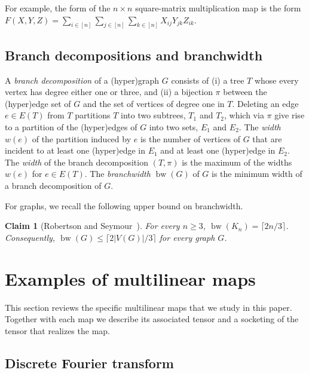 \documentclass[11pt]{article}
\numberwithin{equation}{section}
\newtheorem{claim}[theorem]{Claim}
\theoremstyle{definition}
\theoremstyle{plain}
\DeclareMathOperator{\bw}{bw}
\begin{document}
For example, the form of the $n \times n$ square-matrix multiplication
map is the form $F(X, Y, Z) = \sum_{i \in [n]} \sum_{j \in [n]}
\sum_{k \in [n]} X_{ij}Y_{jk}Z_{ik}$.

\subsection{Branch decompositions and branchwidth}

A \emph{branch decomposition} of a (hyper)graph $G$ consists of
(i) a tree $T$ whose every vertex has degree either one or three, and
(ii) a bijection $\pi$ between the (hyper)edge set of $G$ and the set of
vertices of degree one in $T$. Deleting an edge $e\in E(T)$ from $T$
partitions $T$ into two subtrees, %
 $T_1$ and $T_2$, which via $\pi$
%
give rise  %
to a partition of the (hyper)edges of $G$ into
two sets,  %
$E_1$ and $E_2$.
The \emph{width} $w(e)$
of the partition induced by $e$ is the number of vertices of $G$ that are
incident to at least one (hyper)edge in $E_1$ and at least one (hyper)edge
in $E_2$. The \emph{width} of the branch decomposition $(T,\pi)$ is the maximum
of the widths $w(e)$ for $e\in E(T)$. The \emph{branchwidth} $\bw(G)$ of $G$
is the minimum width of a branch decomposition of $G$.

For graphs, we recall the following upper bound on branchwidth.

\begin{claim}[Robertson and Seymour~\cite{RobertsonS1991}]
  For every $n \ge 3$, $\bw(K_n) = \lceil 2n/3 \rceil$.  Consequently, $\bw(G) \le \lceil 2 |V(G)|/3 \rceil$ for every graph $G$.
\end{claim}






\section{Examples of multilinear maps}
\label{sect:examples}

This section reviews the specific multilinear maps that we study in this
%
paper.  %
Together with each map we describe its associated
tensor and a socketing of the tensor that realizes the map.

\subsection{Discrete Fourier transform}

\label{sect:dft}
\end{document}
